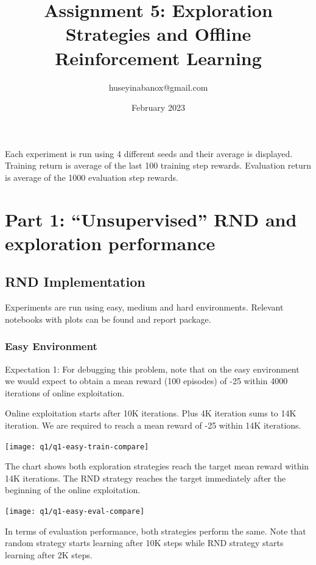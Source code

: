 \documentclass[11pt]{article}
\title{Assignment 5: Exploration Strategies and Offline Reinforcement Learning}
\author{huseyinabanox@gmail.com}
\date{February 2023}
\begin{document}
    \maketitle

    Each experiment is run using 4 different seeds and their average is displayed.
    Training return is average of the last 100 training step rewards.
    Evaluation return is average of the 1000 evaluation step rewards.

    \section{Part 1: “Unsupervised” RND and exploration performance}

    \subsection{RND Implementation}

    Experiments are run using easy, medium and hard environments.
    Relevant notebooks with plots can be found and report package.

    \subsubsection{Easy Environment}

    Expectation 1: For debugging this problem, note that on the easy environment we would expect to obtain a mean reward (100 episodes) of -25 within 4000 iterations of online exploitation.

    Online exploitation starts after 10K iterations.
    Plus 4K iteration sums to 14K iteration.
    We are required to reach a mean reward of -25 within 14K iterations.

    \hspace*{-0.6in}
    \texttt{[image: q1/q1-easy-train-compare]}

    The chart shows both exploration strategies reach the target mean reward within 14K iterations.
    The RND strategy reaches the target immediately after the beginning of the online exploitation.

    \hspace*{-0.6in}
    \texttt{[image: q1/q1-easy-eval-compare]}

    In terms of evaluation performance, both strategies perform the same.
    Note that random strategy starts learning after 10K steps while RND strategy starts learning after 2K steps.
\end{document}
